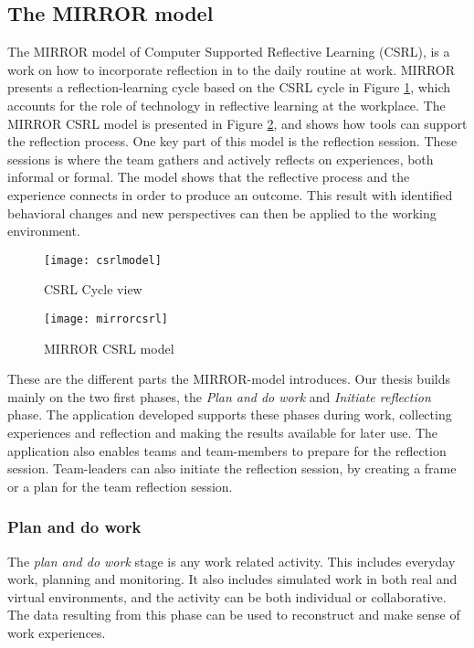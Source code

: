\subsection{The MIRROR model}
\label{mirrorsection}
The MIRROR model of Computer Supported Reflective Learning (CSRL), is a work on how to incorporate reflection in to the daily routine at work. 
MIRROR presents a reflection-learning cycle based on the CSRL cycle in Figure \ref{csrlmodel}, which accounts for the role of technology in reflective learning at the workplace. The MIRROR CSRL model is presented in Figure \ref{mirrormodel}, and shows how tools can support the reflection process. One key part of this model is the reflection session. These sessions is where the team gathers and actively reflects on experiences, both informal or formal. The model shows that the reflective process and the experience connects in order to produce an outcome. This result with identified behavioral changes and new perspectives can then be applied to the working environment. 
\begin{figure}[!htpb]
\centering
	\texttt{[image: csrlmodel]}
\caption{CSRL Cycle view \citep{Krogstie2011}}
\label{csrlmodel}
\end{figure}

\begin{figure}[h!]
\centering
	\texttt{[image: mirrorcsrl]}
\caption{MIRROR CSRL model \citep{csrlmirror121}}
\label{mirrormodel}
\end{figure}

These are the different parts the MIRROR-model introduces. Our thesis builds mainly on the two first phases, the \emph{Plan and do work} and \emph{Initiate reflection} phase. The application developed supports these phases during work, collecting experiences and reflection and making the results available for later use. The application also enables teams and team-members to prepare for the reflection session. Team-leaders can also initiate the reflection session, by creating a frame or a plan for the team reflection session. 
\subsubsection{Plan and do work}
The \emph{plan and do work} stage is any work related activity. This includes everyday work, planning and monitoring. It also includes simulated work in both real and virtual environments, and the activity can be both individual or collaborative. The data resulting from this phase can be used to reconstruct and make sense of work experiences. 


